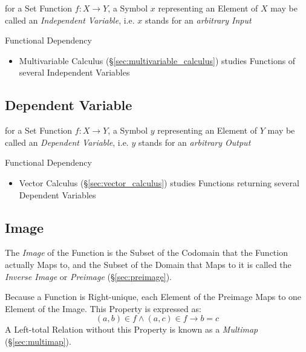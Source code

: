 for a Set Function $f : X \rightarrow Y$, a Symbol $x$ representing an Element
of $X$ may be called an \emph{Independent Variable}, i.e. $x$ stands for an
\emph{arbitrary Input}

Functional Dependency %

\begin{itemize}
  \item Multivariable Calculus (\S\ref{sec:multivariable_calculus}) studies
    Functions of several Independent Variables
\end{itemize}



\subsection{Dependent Variable}\label{sec:dependent_variable}

for a Set Function $f : X \rightarrow Y$, a Symbol $y$ representing an Element
of $Y$ may be called an \emph{Dependent Variable}, i.e. $y$ stands for an
\emph{arbitrary Output}

Functional Dependency %

\begin{itemize}
  \item Vector Calculus (\S\ref{sec:vector_calculus}) studies
    Functions returning several Dependent Variables
\end{itemize}



\subsection{Image}\label{sec:image}

The \emph{Image} of the Function is the Subset of the Codomain that
the Function actually Maps to, and the Subset of the Domain that Maps
to it is called the \emph{Inverse Image} or \emph{Preimage}
(\S\ref{sec:preimage}).

Because a Function is Right-unique, each Element of the Preimage Maps
to one Element of the Image. This Property is expressed as:
\[
  (a,b) \in f \wedge (a,c) \in f \rightarrow b = c
\]
A Left-total Relation without this Property is known as a
\emph{Multimap} (\S\ref{sec:multimap}).



